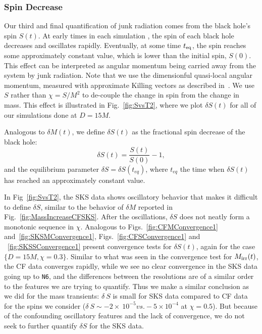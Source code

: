 \subsubsection{Spin Decrease}

Our third and final quantification of junk radiation comes from the
black hole's spin $S(t)$. At early times in each simulation
, the spin
of each black hole decreases and oscillates rapidly. Eventually, at
some time $t_{\rm eq}$, the spin reaches some approximately constant
value, which is lower than the initial spin, $S(0)$. This effect can
be interpreted as angular momentum being carried away from the system
by junk radiation. Note that we use the dimensionful quasi-local
angular momentum, measured with approximate Killing vectors as
described in~\cite{Lovelace2008}. We use $S$ rather than $\chi=S/M^2$
to de-couple the change in spin from the change in mass. This effect
is illustrated in Fig.~\ref{fig:SvsT2}, where we plot $\delta S(t)$
for all of our simulations done at $D=15M$.

Analogous to $\delta M(t)$, we define $\delta S(t)$ as the
fractional spin decrease of the black hole:
\begin{equation}
\delta S(t)=\frac{S(t)}{S(0)} - 1,
\end{equation}
and the equilibrium parameter $\delta S=\delta S(t_{eq})$, where $t_{eq}$ the
time when $\delta S(t)$ has reached an approximately constant value.

In Fig~\ref{fig:SvsT2}, the SKS
data shows oscillatory behavior that makes it difficult to
define $\delta S$, similar to the behavior of $\delta M$ reported in Fig.~\ref{fig:MassIncreaseCFSKS}. After the oscillations, $\delta S$ does
not neatly form a monotonic sequence in $\chi$.
Analogous to Figs.~\ref{fig:CFMConvergence1}
and~\ref{fig:SKSMConvergence1}, Figs.~\ref{fig:CFSConvergence1} and
~\ref{fig:SKSSConvergence1} present convergence tests for $\delta
S(t)$, again for the case $\{D=15M,\chi=0.3\}$. Similar to what was seen
in the convergence test for $M_{\rm irr}(t)$, the CF data converges
rapidly, while we see no clear convergence in the SKS data going up to
{\tt N6}, and the differences between the resolutions are of a similar
order to the features we are trying to quantify. Thus we make a
similar conclusion as we did for the mass transients: $\delta~S$ is
small for SKS data compared to CF data for the spins
we consider ($\delta~S\sim-2\times~10^{-5} vs. -5\times10^{-4}$ at
$\chi=0.5$). But because of the confounding oscillatory features and
the lack of convergence, we do not seek to further quantify $\delta S$
for the SKS data.

